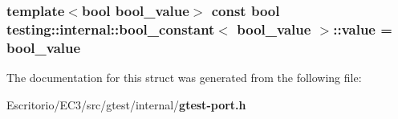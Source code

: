 \subsubsection{\setlength{\rightskip}{0pt plus 5cm}template$<$bool bool\_\-value$>$ const bool {\bf testing::internal::bool\_\-constant}$<$ bool\_\-value $>$::{\bf value} = bool\_\-value\hspace{0.3cm}{\tt  [inline, static]}}\label{structtesting_1_1internal_1_1bool__constant_7f838ce0f0c51ef62c1ae5c8cc909350}




The documentation for this struct was generated from the following file:\begin{CompactItemize}
\item 
Escritorio/EC3/src/gtest/internal/{\bf gtest-port.h}\end{CompactItemize}
